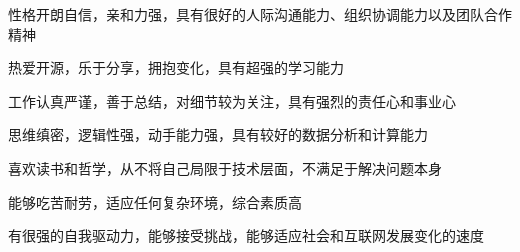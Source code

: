 


\begin{cventries}

\ljycventry
{
\begin{cvitems}
\item {性格开朗自信，亲和力强，具有很好的人际沟通能力、组织协调能力以及团队合作精神}
\item {热爱开源，乐于分享，拥抱变化，具有超强的学习能力}
\item {工作认真严谨，善于总结，对细节较为关注，具有强烈的责任心和事业心}
\item{思维缜密，逻辑性强，动手能力强，具有较好的数据分析和计算能力}
\item{喜欢读书和哲学，从不将自己局限于技术层面，不满足于解决问题本身}
\item{能够吃苦耐劳，适应任何复杂环境，综合素质高}
\item{有很强的自我驱动力，能够接受挑战，能够适应社会和互联网发展变化的速度}
\end{cvitems}
}

\end{cventries}

